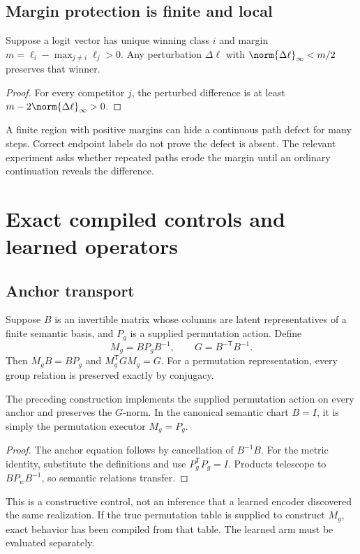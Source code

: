 \documentclass[11pt]{article}
\begin{document}
\subsection{Margin protection is finite and local}
\begin{proposition}
Suppose a logit vector has unique winning class \(i\) and margin \(m=\ell_i-\max_{j\ne i}\ell_j>0\). Any perturbation \(\Delta\ell\) with \(\norm{\Delta\ell}_\infty<m/2\) preserves that winner.
\end{proposition}
\begin{proof}
For every competitor \(j\), the perturbed difference is at least \(m-2\norm{\Delta\ell}_\infty>0\).
\end{proof}
A finite region with positive margins can hide a continuous path defect for many steps. Correct endpoint labels do not prove the defect is absent. The relevant experiment asks whether repeated paths erode the margin until an ordinary continuation reveals the difference.

\section{Exact compiled controls and learned operators}
\subsection{Anchor transport}
Suppose \(B\) is an invertible matrix whose columns are latent representatives of a finite semantic basis, and \(P_g\) is a supplied permutation action. Define
\[
 M_g=BP_gB^{-1},\qquad G=B^{-\mathsf T}B^{-1}.
\]
Then \(M_gB=BP_g\) and \(M_g^{\mathsf T}GM_g=G\). For a permutation representation, every group relation is preserved exactly by conjugacy.

\begin{proposition}
The preceding construction implements the supplied permutation action on every anchor and preserves the \(G\)-norm. In the canonical semantic chart \(B=I\), it is simply the permutation executor \(M_g=P_g\).
\end{proposition}
\begin{proof}
The anchor equation follows by cancellation of \(B^{-1}B\). For the metric identity, substitute the definitions and use \(P_g^{\mathsf T}P_g=I\). Products telescope to \(BP_wB^{-1}\), so semantic relations transfer.
\end{proof}
This is a constructive control, not an inference that a learned encoder discovered the same realization. If the true permutation table is supplied to construct \(M_g\), exact behavior has been compiled from that table. The learned arm must be evaluated separately.
\end{document}
